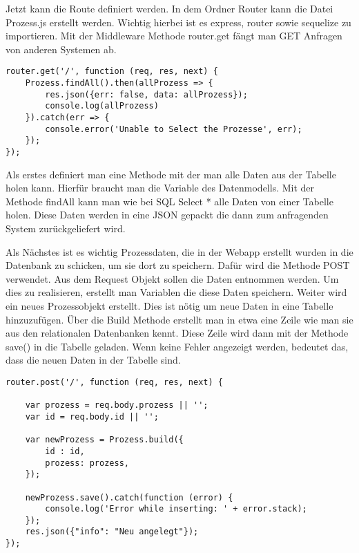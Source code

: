 \documentclass[a4paper,11pt]{scrreprt}
\begin{document}
Jetzt kann die Route definiert werden. In dem Ordner Router kann die Datei Prozess.js erstellt werden. Wichtig hierbei ist es express, router sowie sequelize zu importieren.
Mit der Middleware Methode router.get fängt man GET Anfragen von anderen Systemen ab.
 \begin{lstlisting}
router.get('/', function (req, res, next) {
    Prozess.findAll().then(allProzess => {
        res.json({err: false, data: allProzess});
        console.log(allProzess)
    }).catch(err => {
        console.error('Unable to Select the Prozesse', err);
    });
});
\end{lstlisting}
Als erstes definiert man eine Methode mit der man alle Daten aus der Tabelle holen kann. Hierfür braucht man die Variable des Datenmodells. Mit der Methode findAll kann man wie bei SQL Select * alle Daten von einer Tabelle holen. Diese Daten werden in eine JSON gepackt die dann zum anfragenden System zurückgeliefert wird. 

Als Nächstes ist es wichtig Prozessdaten, die in der Webapp erstellt wurden in die Datenbank zu schicken, um sie dort zu speichern. Dafür wird die Methode POST verwendet.
Aus dem Request Objekt sollen die Daten entnommen werden. Um dies zu realisieren, erstellt man Variablen die diese Daten speichern. Weiter wird ein neues Prozessobjekt erstellt. Dies ist nötig um neue Daten in eine Tabelle hinzuzufügen. Über die Build Methode erstellt man in etwa eine Zeile wie man sie aus den relationalen Datenbanken kennt. Diese Zeile wird dann mit der Methode save() in die Tabelle geladen. Wenn keine Fehler angezeigt werden, bedeutet das, dass die neuen Daten in der Tabelle sind.
 \begin{lstlisting}
router.post('/', function (req, res, next) {

    var prozess = req.body.prozess || '';
    var id = req.body.id || '';

    var newProzess = Prozess.build({
        id : id,
        prozess: prozess,
    });

    newProzess.save().catch(function (error) {
        console.log('Error while inserting: ' + error.stack);
    });
    res.json({"info": "Neu angelegt"});
});
\end{lstlisting}
\end{document}
